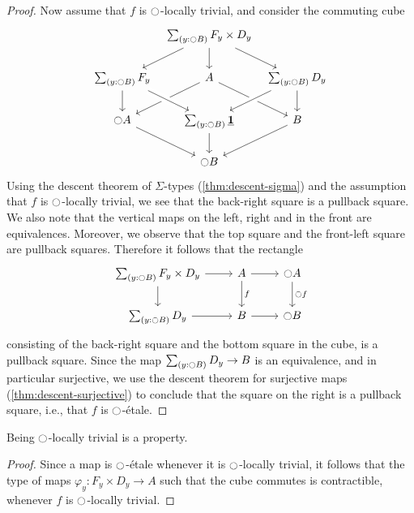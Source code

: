 \documentclass[9pt,twosided]{amsart}
\begin{document}
\begin{proof}
  Now assume that $f$ is ${\ocircle}$-locally trivial, and consider the commuting cube
  \begin{equation*}
    \begin{tikzcd}[column sep=tiny]
      & \sm{y:\modal B}F_y\times D_y \arrow[dl] \arrow[d] \arrow[dr] & \phantom{\modal A} \\
      \sm{y:\modal B}F_y \arrow[d] & A \arrow[dl] \arrow[dr] & \sm{y:\modal B}D_y \arrow[dl,crossing over] \arrow[d] \\
      \modal A \arrow[dr] & \sm{y:\modal B}\unit \arrow[from=ul,crossing over] \arrow[d] & B \arrow[dl] \\
      & \modal B
    \end{tikzcd}
  \end{equation*}
  Using the descent theorem of $\Sigma$-types (\cref{thm:descent-sigma}) and the assumption that $f$ is ${\ocircle}$-locally trivial, we see that the back-right square is a pullback square. We also note that the vertical maps on the left, right and in the front are equivalences. Moreover, we observe that the top square and the front-left square are pullback squares. Therefore it follows that the rectangle 
  \begin{equation*}
    \begin{tikzcd}
      \sm{y:\modal B} F_y\times D_y \arrow[r] \arrow[d] & A \arrow[d,"f"] \arrow[r] & \modal A \arrow[d,"\modal f"] \\
      \sm{y:\modal B}D_y \arrow[r] & B \arrow[r] & \modal B 
    \end{tikzcd}
  \end{equation*}
  consisting of the back-right square and the bottom square in the cube, is a pullback square. Since the map $\sm{y:\modal B}D_y\to B$ is an equivalence, and in particular surjective, we use the descent theorem for surjective maps (\cref{thm:descent-surjective}) to conclude that the square on the right is a pullback square, i.e., that $f$ is ${\ocircle}$-\'etale.
\end{proof}

\begin{cor}
  Being ${\ocircle}$-locally trivial is a property.
\end{cor}

\begin{proof}
  Since a map is ${\ocircle}$-\'etale whenever it is ${\ocircle}$-locally trivial, it follows that the type of maps $\varphi_y:F_y\times D_y\to A$ such that the cube commutes is contractible, whenever $f$ is ${\ocircle}$-locally trivial.
\end{proof}
\end{document}
